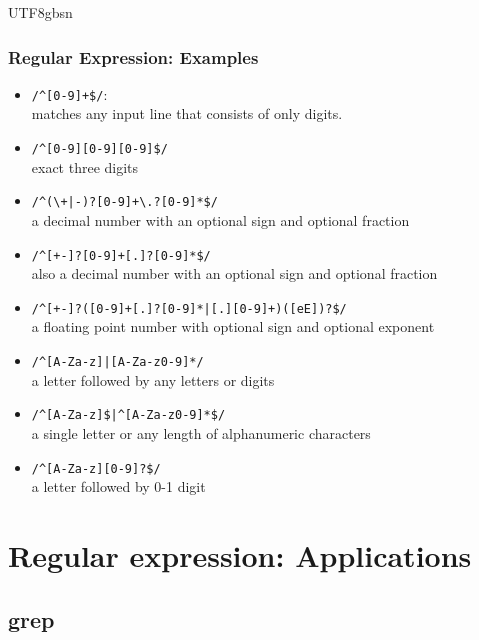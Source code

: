 \documentclass[red]{beamer}
\newcommand*{\lstverb}{\lstinline[style=caret]}
\begin{document}
\begin{CJK*}{UTF8}{gbsn}
\begin{frame}
\frametitle{Regular Expression: Examples}
\footnotesize
\begin{itemize}
	\item[] \lstverb{/^[0-9]+$/}: \\matches any input line that consists of only digits.
	\item[] \lstverb{/^[0-9][0-9][0-9]$/}\\{exact three digits}
	\item[] \lstverb{/^(\+|-)?[0-9]+\.?[0-9]*$/}\\{a decimal number with an optional sign and optional fraction}
	\item[] \lstverb{/^[+-]?[0-9]+[.]?[0-9]*$/}\\{also a decimal number with an optional sign and optional fraction}
	\item[] \lstverb{/^[+-]?([0-9]+[.]?[0-9]*|[.][0-9]+)([eE])?$/}\\{a floating point number with optional sign and optional exponent}
	\item[] \lstverb{/^[A-Za-z]|[A-Za-z0-9]*/}\\{a letter followed by any letters or digits}
	\item[] \lstverb{/^[A-Za-z]$|^[A-Za-z0-9]*$/}\\{a single letter or any length of alphanumeric characters}
	\item[] \lstverb{/^[A-Za-z][0-9]?$/}\\{a letter followed by 0-1 digit}
\end{itemize}
\end{frame}

\section{Regular expression: Applications}

\subsection{grep}


\end{CJK*}
\end{document}
